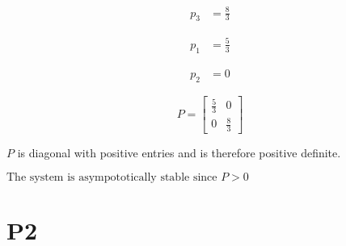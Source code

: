 \documentclass{article}
\begin{document}
\begin{enumerate}[label=\alph*)]
\begin{enumerate}[label=\roman*)]
    \begin{align*}
        p_3 &= \boxed{\frac{8}{3}}
    \end{align*}

    \begin{align*}
        p_1 &= \boxed{\frac{5}{3}}
    \end{align*}

    \begin{align*}
        p_2 &= \boxed{0}
    \end{align*}

    \[
    P = 
    \begin{bmatrix}
        \frac{5}{3} & 0 \\
        0 & \frac{8}{3}
    \end{bmatrix} 
    \]

    $P$ is diagonal with positive entries and is therefore positive definite.

    $\boxed{\text{The system is asympototically stable since $P > 0$}}$
    \end{enumerate}
\end{enumerate}

\section*{P2}
\end{document}
